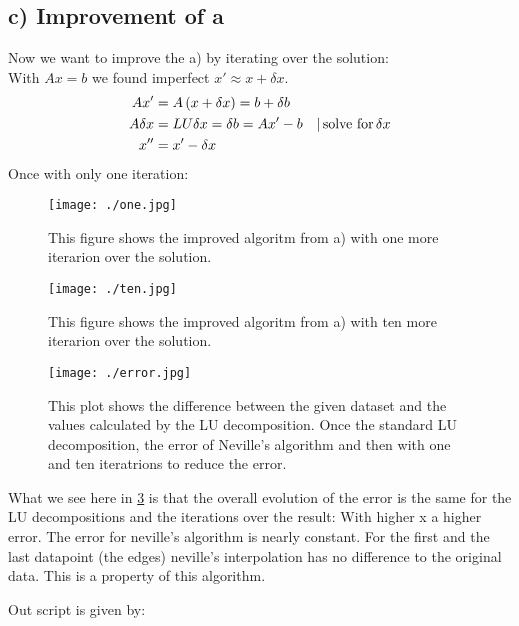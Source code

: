 \subsection*{c) Improvement of a}
Now we want to improve the a) by iterating over the solution:\\
With $A x = b$ we found imperfect $x' \approx x + \delta x$.
\begin{align}
    Ax' &= A\left({x+ \delta x}\right) = b + \delta b\\
    A \delta x &= L U \delta x =  \delta b = Ax' - b \quad | \, \text{solve for} \, \delta x\\
    x '' &= x ' - \delta x
\end{align}
Once with only one iteration: 

\begin{figure}
    \centering
    \texttt{[image: ./one.jpg]}
    \caption{This figure shows the improved algoritm from a) with one more iterarion over the solution. }
    \label{fig:enter-label}
\end{figure}

\begin{figure}
    \centering
    \texttt{[image: ./ten.jpg]}
    \caption{This figure shows the improved algoritm from a) with ten more iterarion over the solution. }
    \label{fig:}
\end{figure}

\begin{figure}
    \centering
    \texttt{[image: ./error.jpg]}
    \caption{This plot shows the difference between the given dataset and the values calculated by the LU decomposition. Once the standard LU decomposition, the error of Neville's algorithm and then with one and ten iteratrions to reduce the error.}
    \label{fig:err}
\end{figure}
What we see here in \ref{fig:err} is that the overall evolution of the error is the same for the LU decompositions and the iterations over the result: With higher x a higher error. The error for neville's algorithm is nearly constant. For the first and the last datapoint (the edges) neville's interpolation has no difference to the original data. This is a property of this algorithm.


Out script is given by:

